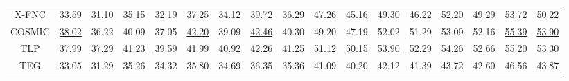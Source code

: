\begin{table*}[ht]
{\begin{tabular}{@{}c|cccccccc|cccccccc@{}}
X-FNC                    & 33.59          & 31.10          & 35.15          & 32.19          & 37.25          & 34.12          & 39.72          & 36.29          & 47.26          & 45.16          & 49.30          & 46.22          & 52.20          & 49.29          & 53.72          & 50.22          \\ 
COSMIC                    & \underline{38.02}          & 36.22          & 40.09          & 37.05          & \underline{42.20}          & 39.09          & \underline{42.46}          & 40.30          & 49.20          & 47.19          & 52.02          & 51.29          & 53.09          & 52.16          & \underline{55.39}          & \underline{53.90}          \\
TLP                    & 37.99          & \underline{37.29}          & \underline{41.23}          & \underline{39.59}          & 41.99          & \underline{40.92}          & 42.26          & \underline{41.25}          & \underline{51.12}          & \underline{50.15}          & \underline{53.90}          & \underline{52.29}          & \underline{54.26}          & \underline{52.66}          & 55.20          & 53.30          \\
TEG                    & 33.05          & 31.29          & 35.26          & 34.32          & 35.80          & 34.69          & 36.35          & 35.36          & 41.09          & 40.20          & 42.12          & 41.39          & 43.72          & 42.60          & 46.56          & 43.87          \\
\midrule

\end{tabular}}
\end{table*}
